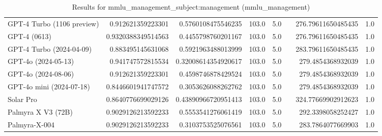 \begin{table}[htp]
{\begin{tabular}{lrrrrrrr}
GPT-4 Turbo (1106 preview) & 0.912621359223301 & 0.5760108475546235 & 103.0 & 5.0 &  & 276.79611650485435 & 1.0 \\
GPT-4 (0613) & 0.9320388349514563 & 0.4455798760201167 & 103.0 & 5.0 &  & 276.79611650485435 & 1.0 \\
GPT-4 Turbo (2024-04-09) & 0.883495145631068 & 0.5921963488013999 & 103.0 & 5.0 &  & 283.79611650485435 & 1.0 \\
GPT-4o (2024-05-13) & 0.941747572815534 & 0.32008614354920617 & 103.0 & 5.0 &  & 279.4854368932039 & 1.0 \\
GPT-4o (2024-08-06) & 0.912621359223301 & 0.4598746878429524 & 103.0 & 5.0 &  & 279.4854368932039 & 1.0 \\
GPT-4o mini (2024-07-18) & 0.8446601941747572 & 0.3053626088262762 & 103.0 & 5.0 &  & 279.4854368932039 & 1.0 \\
Solar Pro & 0.8640776699029126 & 0.43890966720951413 & 103.0 & 5.0 &  & 324.77669902912623 & 1.0 \\
Palmyra X V3 (72B) & 0.9029126213592233 & 0.5553541276061419 & 103.0 & 5.0 &  & 292.3398058252427 & 1.0 \\
Palmyra-X-004 & 0.9029126213592233 & 0.3103753525076561 & 103.0 & 5.0 &  & 283.7864077669903 & 1.0 \\
\bottomrule
\end{tabular}}
\caption{Results for mmlu_management_subject:management (mmlu_management)}
\label{fig:mmlu_management_subject:management (mmlu_management)}
\end{table}